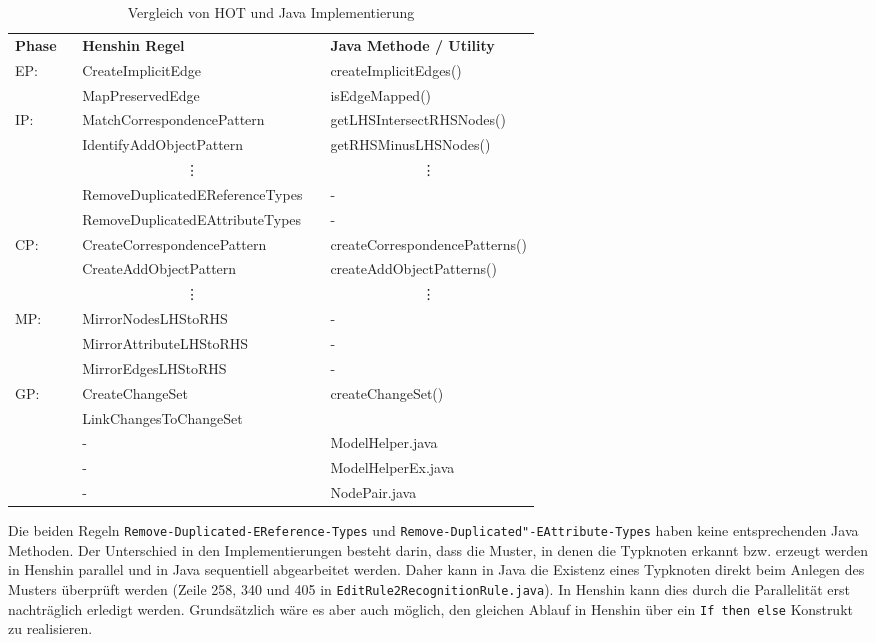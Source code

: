 \begin{table}[h!]
\centering
\caption{Vergleich von HOT und Java Implementierung}
\begin{tabular}{llcl}
\toprule
\textbf{Phase} \ & \textbf{Henshin Regel}  & & \textbf{Java Methode / Utility} \\
\cmidrule{1-4}
EP: & CreateImplicitEdge & & createImplicitEdges() \\
& MapPreservedEdge & & isEdgeMapped() \\

IP: & MatchCorrespondencePattern & & getLHSIntersectRHSNodes() \\
& IdentifyAddObjectPattern & & getRHSMinusLHSNodes() \\
& \multicolumn{1}{c}{\vdots} & & \multicolumn{1}{c}{\vdots} \\
& RemoveDuplicatedEReferenceTypes & & -  \\
& RemoveDuplicatedEAttributeTypes & & -  \\

CP: & CreateCorrespondencePattern & & createCorrespondencePatterns()  \\
& CreateAddObjectPattern & & createAddObjectPatterns()  \\
& \multicolumn{1}{c}{\vdots} & & \multicolumn{1}{c}{\vdots} \\

MP: & MirrorNodesLHStoRHS & & - \\
& MirrorAttributeLHStoRHS & & - \\
& MirrorEdgesLHStoRHS & & - \\

GP: & CreateChangeSet & & \multirow{2}{*}{createChangeSet()} \\
& LinkChangesToChangeSet & & \\
\cmidrule{2-4}
& - & & ModelHelper.java \\
& - & & ModelHelperEx.java \\
& - & & NodePair.java \\
\bottomrule
\end{tabular}
  \label{tab:java-comparison}
\end{table}

Die beiden Regeln \texttt{Remove-Duplicated-EReference-Types} und
\texttt{Remove-Duplicated"-EAttribute-Types} haben keine entsprechenden Java Methoden. Der
Unterschied in den Implementierungen besteht darin, dass die Muster, in denen die Typknoten erkannt
bzw. erzeugt werden in Henshin parallel und in Java sequentiell abgearbeitet werden. Daher kann in
Java die Existenz eines Typknoten direkt beim Anlegen des Musters überprüft werden (Zeile 258, 340
und 405 in \texttt{EditRule2RecognitionRule.java}). In Henshin kann dies durch die Parallelität erst
nachträglich erledigt werden. Grundsätzlich wäre es aber auch möglich, den gleichen Ablauf in
Henshin über ein \texttt{If then else} Konstrukt zu realisieren.

